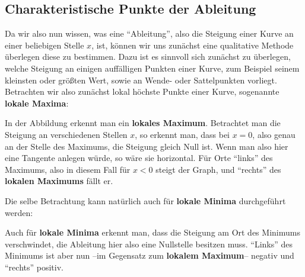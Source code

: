 \documentclass[../../main.tex]{subfiles}
\begin{document}
    \subsection{Charakteristische Punkte der Ableitung}
    Da wir also nun wissen, was eine \enquote{Ableitung}, also die Steigung einer Kurve an einer beliebigen Stelle $x$, ist, können wir uns zunächst eine qualitative Methode überlegen diese zu bestimmen. Dazu ist es sinnvoll sich zunächst zu überlegen, welche Steigung an einigen auffälligen Punkten einer Kurve, zum Beispiel seinem kleinsten oder größten Wert, sowie an Wende- oder Sattelpunkten vorliegt.\\
    Betrachten wir also zunächst lokal höchste Punkte einer Kurve, sogenannte \textbf{lokale Maxima}:
    \begin{multicols}{2}
        In der Abbildung erkennt man ein \textbf{lokales Maximum}. Betrachtet man die Steigung an verschiedenen Stellen $x$, so erkennt man, dass bei $x=0$, also genau an der Stelle des Maximums, die Steigung gleich Null ist. Wenn man also hier eine Tangente anlegen würde, so wäre sie horizontal. Für Orte \enquote{links} des Maximums, also in diesem Fall für $x < 0$ steigt der Graph, und \enquote{rechts} des \textbf{lokalen Maximums} fällt er.
     \begin{center}\normalsize
             \end{center}
    \end{multicols}
    Die selbe Betrachtung kann natürlich auch für \textbf{lokale Minima} durchgeführt werden:
    \begin{multicols}{2}
       Auch für \textbf{lokale Minima} erkennt man, dass die Steigung am Ort des Minimums verschwindet, die Ableitung hier also eine Nullstelle besitzen muss. \enquote{Links} des Minimums ist aber nun --im Gegensatz zum \textbf{lokalem Maximum}-- negativ und \enquote{rechts} positiv.
     \begin{center}\normalsize
             \end{center}
    \end{multicols}
\end{document}
